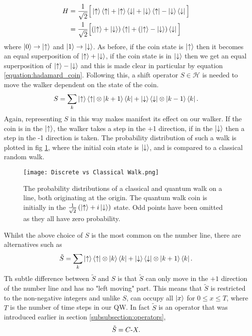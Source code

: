 \begin{align}
    H &= \frac{1}{\sqrt{2}}\Big[
    \ket{\uparrow}\bra{\uparrow} +
    \ket{\uparrow}\bra{\downarrow} +
    \ket{\downarrow}\bra{\uparrow} -
    \ket{\downarrow}\bra{\downarrow}\Big]\\
    &= \frac{1}{\sqrt{2}}\Big[(\ket{\uparrow} + \ket{\downarrow})\bra{\uparrow} +
    (\ket{\uparrow} - \ket{\downarrow})\bra{\downarrow}\Big]
    \label{equation:hadamard_coin}
\end{align}
where $\ket{0} \rightarrow \ket{\uparrow}$ and $\ket{1} \rightarrow \ket{\downarrow}$.
As before, if the coin state is $\ket{\uparrow}$ then it becomes an equal superposition of $\ket{\uparrow} + \ket{\downarrow}$, if the coin state is in $\ket{\downarrow}$ then we get an equal superposition of $\ket{\uparrow} - \ket{\downarrow}$ and this is made clear in particular by equation \ref{equation:hadamard_coin}.
Following this, a shift operator $S \in \mathcal{H}$ is needed to move the walker dependent on the state of the coin.
\begin{equation}
    S = \sum_k \ket{\uparrow}\bra{\uparrow} \otimes \ket{k + 1}\bra{k} + \ket{\downarrow}\bra{\downarrow} \otimes \ket{k - 1}\bra{k}.
\end{equation}
Again, representing $S$ in this way makes manifest its effect on our walker. 
If the coin is in the $\ket{\uparrow}$, the walker takes a step in the +1 direction, if in the $\ket{\downarrow}$ then a step in the -1 direction is taken.
The probability distribution of such a walk is plotted in fig \ref{fig:discVSclass}, where the initial coin state is $\ket{\downarrow}$, and is compared to a classical random walk.\newline

\begin{figure}
    \centering
    \texttt{[image: Discrete vs Classical Walk.png]}
    \caption{The probability distributions of a classical and quantum walk on a line, both originating at the origin. The quantum walk coin is initially in the $\frac{1}{\sqrt{2}}\left(\ket{\uparrow} + i\ket{\downarrow}\right)$ state. Odd points have been omitted as they all have zero probability.}
    \label{fig:discVSclass}
\end{figure}

Whilst the above choice of $S$ is the most common on the number line, there are alternatives such as
\begin{equation}
    \tilde{S} = \sum_k \ket{\uparrow}\bra{\uparrow} \otimes \ket{k}\bra{k} + \ket{\downarrow}\bra{\downarrow} \otimes \ket{k + 1}\bra{k}.
\end{equation}
Th subtle difference between $\tilde{S}$ and $S$ is that $\tilde{S}$ can only move in the $+1$ direction of the number line and has no "left moving" part.
This means that $\tilde{S}$ is restricted to the non-negative integers and unlike $S$, can occupy all $\ket{x}$ for $0\leq x\leq T$, where $T$ is the number of time steps in our QW.
In fact $\tilde{S}$ is an operator that was introduced earlier in section \ref{subsubsection:operators},
\begin{equation}
    \tilde{S} = C\text{-}X.
\end{equation}
\FloatBarrier